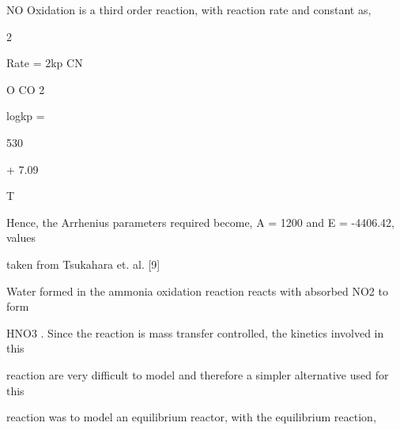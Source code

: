 \documentclass[a4paper,portrait,12pt]{article}
\begin{document}
\begin{flushleft}
NO Oxidation is a third order reaction, with reaction rate and constant as,
\end{flushleft}


2


\begin{flushleft}
Rate = 2kp CN
\end{flushleft}


\begin{flushleft}
O CO 2
\end{flushleft}





\begin{flushleft}
logkp =
\end{flushleft}





530


+ 7.09


\begin{flushleft}
T
\end{flushleft}





\begin{flushleft}
Hence, the Arrhenius parameters required become, A = 1200 and E = -4406.42, values
\end{flushleft}


\begin{flushleft}
taken from Tsukahara et. al. [9]
\end{flushleft}


\begin{flushleft}
Water formed in the ammonia oxidation reaction reacts with absorbed NO2 to form
\end{flushleft}


\begin{flushleft}
HNO3 . Since the reaction is mass transfer controlled, the kinetics involved in this
\end{flushleft}


\begin{flushleft}
reaction are very difficult to model and therefore a simpler alternative used for this
\end{flushleft}


\begin{flushleft}
reaction was to model an equilibrium reactor, with the equilibrium reaction,
\end{flushleft}
\end{document}
